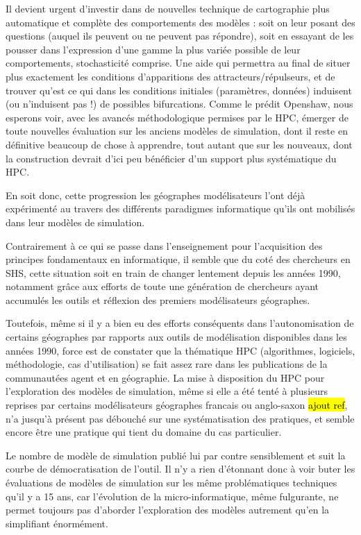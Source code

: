 Il devient urgent d'investir dans de nouvelles technique de cartographie plus automatique et complète des comportements des modèles : soit on leur posant des questions (auquel ils peuvent ou ne peuvent pas répondre), soit en essayant de les pousser dans l'expression d'une gamme la plus variée possible de leur comportements, stochasticité comprise. Une aide qui permettra au final de situer plus exactement les conditions d'apparitions des attracteurs/répulseurs, et de trouver qu'est ce qui dans les conditions initiales (paramètres, données) induisent (ou n'induisent pas !) de possibles bifurcations. Comme le prédit Openshaw, nous esperons voir, avec les avancés méthodologique permises par le HPC, émerger de toute nouvelles évaluation sur les anciens modèles de simulation, dont il reste en définitive beaucoup de chose à apprendre, tout autant que sur les nouveaux, dont la construction devrait d'ici peu bénéficier d'un support plus systématique du HPC.

En soit donc, cette progression les géographes modélisateurs l'ont déjà expérimenté au travers des différents paradigmes informatique qu'ils ont mobilisés dans leur modèles de simulation.

Contrairement à ce qui se passe dans l'enseignement pour l'acquisition des principes fondamentaux en informatique, il semble que du coté des chercheurs en SHS, cette situation soit en train de changer lentement depuis les années 1990, notamment grâce aux efforts de toute une génération de chercheurs ayant accumulés les outils et réflexion des premiers modélisateurs géographes.

Toutefois, même si il y a bien eu des efforts conséquents dans l'autonomisation de certains géographes par rapports aux outils de modélisation disponibles dans les années 1990, force est de constater que la thématique HPC (algorithmes, logiciels, méthodologie, cas d'utilisation) se fait assez rare dans les publications de la communautées agent et en géographie. La mise à disposition du HPC pour l'exploration des modèles de simulation, même si elle a été tenté à plusieurs reprises par certains modélisateurs géographes francais ou anglo-saxon \autocite{Heppenstall2007} \hl{ajout ref}, n'a jusqu'à présent pas débouché sur une systématisation des pratiques, et semble encore être une pratique qui tient du domaine du cas particulier.

Le nombre de modèle de simulation publié lui par contre sensiblement et suit la courbe de démocratisation de l'outil. Il n'y a rien d'étonnant donc à voir buter les évaluations de modèles de simulation sur les même problématiques techniques qu'il y a 15 ans, car l'évolution de la micro-informatique, même fulgurante, ne permet toujours pas d'aborder l'exploration des modèles autrement qu'en la simplifiant énormément.

